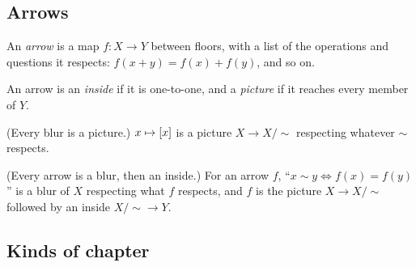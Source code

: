 \subsection*{Arrows}

\begin{lines}
\item[\lab{W1}] An \emph{arrow} is a map $f : X \to Y$ between floors, with a list of the operations and questions it respects: $f(x + y) = f(x) + f(y)$, and so on.
\item[\lab{W2}] An arrow is an \emph{inside} if it is one-to-one, and a \emph{picture} if it reaches every member of $Y$.
\item[\lab{W3}] (Every blur is a picture.) $x \mapsto [x]$ is a picture $X \to X/{\sim}$ respecting whatever $\sim$ respects.
\item[\lab{W4}] (Every arrow is a blur, then an inside.) For an arrow $f$, ``$x \sim y \iff f(x) = f(y)$'' is a blur of $X$ respecting what $f$ respects, and $f$ is the picture $X \to X/{\sim}$ followed by an inside $X/{\sim} \to Y$.
\end{lines}

\subsection*{Kinds of chapter}

